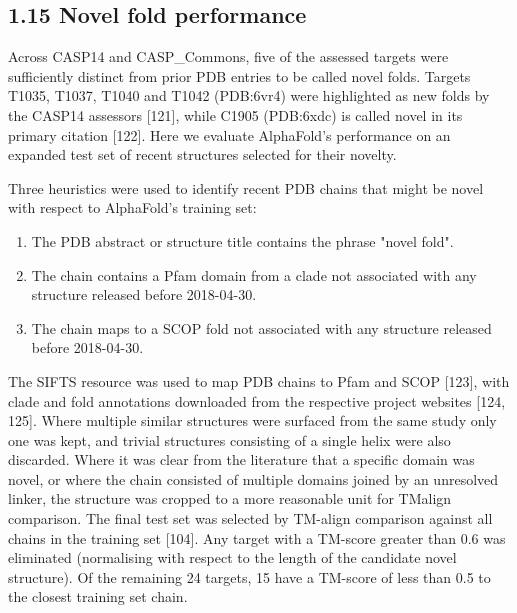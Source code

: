 \documentclass[10pt]{article}
\begin{document}
\subsection*{1.15 Novel fold performance}
Across CASP14 and CASP\_Commons, five of the assessed targets were sufficiently distinct from prior PDB entries to be called novel folds. Targets T1035, T1037, T1040 and T1042 (PDB:6vr4) were highlighted as new folds by the CASP14 assessors [121], while C1905 (PDB:6xdc) is called novel in its primary citation [122]. Here we evaluate AlphaFold's performance on an expanded test set of recent structures selected for their novelty.

Three heuristics were used to identify recent PDB chains that might be novel with respect to AlphaFold's training set:

\begin{enumerate}
  \item The PDB abstract or structure title contains the phrase "novel fold".
  \item The chain contains a Pfam domain from a clade not associated with any structure released before 2018-04-30.
  \item The chain maps to a SCOP fold not associated with any structure released before 2018-04-30.
\end{enumerate}

The SIFTS resource was used to map PDB chains to Pfam and SCOP [123], with clade and fold annotations downloaded from the respective project websites [124, 125]. Where multiple similar structures were surfaced from the same study only one was kept, and trivial structures consisting of a single helix were also discarded. Where it was clear from the literature that a specific domain was novel, or where the chain consisted of multiple domains joined by an unresolved linker, the structure was cropped to a more reasonable unit for TMalign comparison. The final test set was selected by TM-align comparison against all chains in the training set [104]. Any target with a TM-score greater than 0.6 was eliminated (normalising with respect to the length of the candidate novel structure). Of the remaining 24 targets, 15 have a TM-score of less than 0.5 to the closest training set chain.
\end{document}
